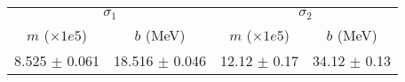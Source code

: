 \begin{tabular}{cc|cc}
\multicolumn{2}{c|}{$\sigma_1$} & \multicolumn{2}{|c}{$\sigma_2$} \\
$m$ ($\times1e5$) & $b$ (MeV) & $m$ ($\times1e5$) & $b$ (MeV) \\
\hline
8.525 $\pm$ 0.061 & 18.516 $\pm$ 0.046 & 12.12 $\pm$ 0.17 & 34.12 $\pm$ 0.13\\
\end{tabular}
